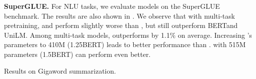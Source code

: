 \textbf{SuperGLUE.}
For NLU tasks, we evaluate models on the SuperGLUE benchmark. The results are also shown in . We observe that with multi-task pretraining, \docmodel and \sentmodel perform slightly worse than \modelx\largem, but still outperform BERT\largem and UniLM\largem. Among multi-task models, \sentmodel outperforms \docmodel by 1.1\% on average. Increasing \docmodel's parameters to 410M (1.25BERT\largem) leads to better performance than \modelx\largem. \model with 515M parameters (1.5BERT\largem) can perform even better.



\begin{table}[t]
\centering
  \small
    \caption{Results on Gigaword summarization.}
     \label{tab:gigaword}
\vspace{0.2in}
   \centering
    \caption{Results on SQuAD question generation.}
        \label{tab:squad_qg}

\end{table}
